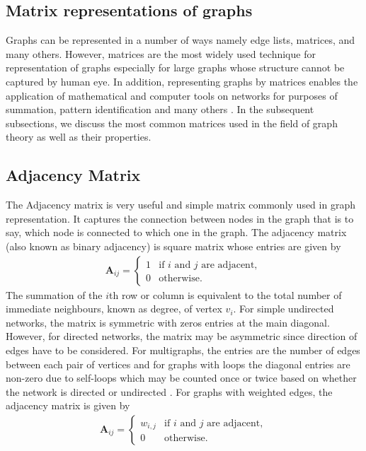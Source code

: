 \documentclass[10pt,a4paper]{article}
\theoremstyle{plain}
\theoremstyle{definition}
\begin{document}
\subsection{Matrix representations of graphs}
Graphs can be represented in a number of ways namely edge lists, matrices, and many others. However, matrices are the most widely used technique for representation of graphs especially for large graphs whose structure cannot be captured by human eye. In addition, representing graphs by matrices enables the application of mathematical and computer tools on networks for purposes of summation, pattern identification and many others \citep{chandak2017novel,turan1984succinct}. In the subsequent subsections, we discuss the most common matrices used in the field of graph theory as well as their properties.

\subsection{Adjacency Matrix}
The Adjacency matrix is very useful and simple matrix commonly used in graph representation. It captures the connection between nodes in the graph that is to say, which node is connected to which one in the graph. The adjacency matrix (also known as binary adjacency) is square matrix whose entries are given by
\begin{eqnarray}
\mathbf{A}_{ij} = \begin{cases} 1 &\mbox{if } i \text{ and } j \text{ are adjacent}, \\
0 & \text{otherwise}.
\end{cases}
\end{eqnarray}
The summation of the $i$th row or column is equivalent to the total number of immediate neighbours, known as degree, of  vertex $v_i$. For simple undirected networks, the matrix is symmetric with zeros entries at the main diagonal. However, for directed networks, the matrix may be asymmetric since direction of edges have to be considered. For multigraphs, the entries  are the number of edges between each pair of vertices and for graphs with loops the diagonal entries are non-zero due to self-loops which may be counted once or twice based on whether the network is directed or undirected \citep{biggs1993algebraic,godsil2001algebraic}. For graphs with weighted edges, the adjacency matrix is given by 
\begin{eqnarray}
\mathbf{A}_{ij} = \begin{cases} w_{i,j} &\mbox{if } i \text{ and } j \text{ are adjacent}, \\
0 & \text{otherwise}.
\end{cases}
\end{eqnarray}
\end{document}
